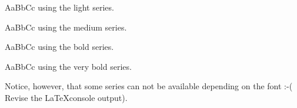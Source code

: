 \documentclass{report}
\begin{document}
\Huge
{\par{}\selectfont AaBbCc using the light series.}
{\par{}\selectfont AaBbCc using the medium series.}
{\par{}\selectfont AaBbCc using the bold series.}
{\par{}\selectfont AaBbCc using the very bold series.}

Notice, however, that some series can not be available depending on
the font :-( Revise the \LaTeX console output).
\end{document}
